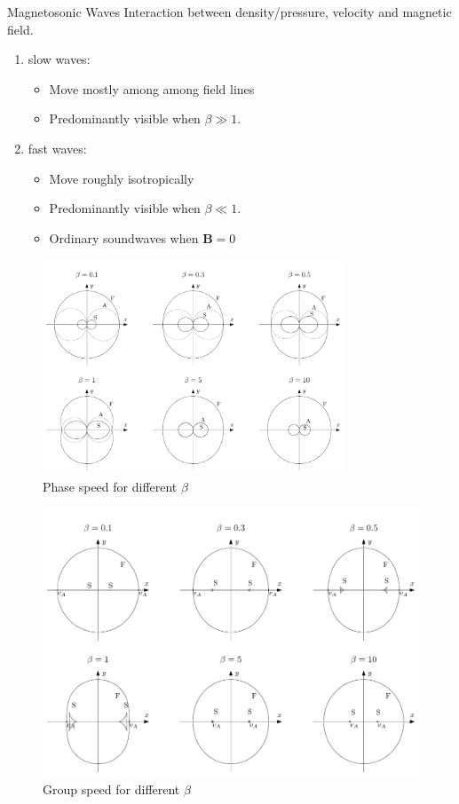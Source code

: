 \documentclass{beamer}
\begin{document}
\begin{frame}{Magnetosonic Waves}
	Interaction between density/pressure, velocity and magnetic field. 
	\begin{enumerate}
		\item slow waves:
			\begin{itemize}
				\item Move mostly among among field lines
				\item Predominantly visible when $\beta \gg 1$.
			\end{itemize}
		\item fast waves:
			\begin{itemize}
				\item Move roughly isotropically 
				\item Predominantly visible when $\beta \ll 1$.
				\item Ordinary soundwaves when $\mathbf B = 0$
			\end{itemize}
	\end{enumerate}
\end{frame}
\begin{frame}
	\begin{figure}[h]
		\centering
		\includegraphics[width=0.8\textwidth]{../report/figures/fasespeed_beta.pdf}
		\caption{Phase speed for different $\beta$}	
	\end{figure}
\end{frame}
\begin{frame}
	\begin{figure}[h]
		\centering
		\includegraphics[width=.9\textwidth]{../report/figures/groupspeed_beta.pdf}
		\caption{Group speed for different $\beta$}
	\end{figure}	
\end{frame}
\end{document}
